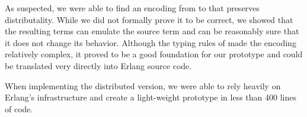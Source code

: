 As suspected, we were able to find an encoding
from \corejoincalc to \actorpicalc
that preserves distributality.
While we did not formally prove it to be correct,
we showed that the resulting terms can emulate the source term
and can be reasonably sure that it does not change its behavior.
Although the typing rules of \actorpicalc made the encoding relatively complex,
it proved to be a good foundation for our prototype
and could be translated very directly into Erlang source code.

When implementing the distributed version,
we were able to rely heavily on Erlang's infrastructure
and create a light-weight prototype in less than 400 lines of code.

